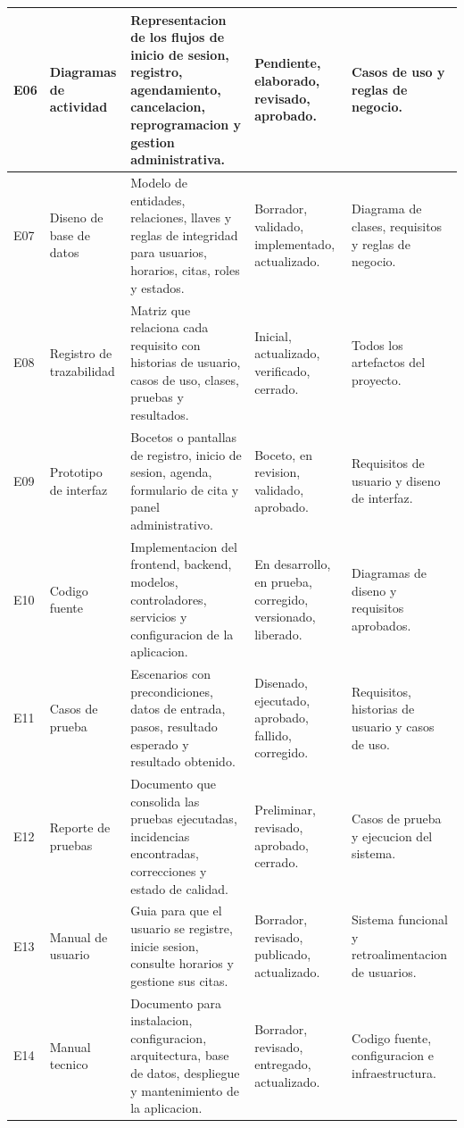 \documentclass[12pt,letterpaper]{article}
\begin{document}
\begin{longtable}{|p{1.2cm}|p{3.2cm}|p{5.4cm}|p{3.2cm}|p{3.2cm}|}
E06 & Diagramas de actividad & Representacion de los flujos de inicio de sesion, registro, agendamiento, cancelacion, reprogramacion y gestion administrativa. & Pendiente, elaborado, revisado, aprobado. & Casos de uso y reglas de negocio. \\
\hline

E07 & Diseno de base de datos & Modelo de entidades, relaciones, llaves y reglas de integridad para usuarios, horarios, citas, roles y estados. & Borrador, validado, implementado, actualizado. & Diagrama de clases, requisitos y reglas de negocio. \\
\hline

E08 & Registro de trazabilidad & Matriz que relaciona cada requisito con historias de usuario, casos de uso, clases, pruebas y resultados. & Inicial, actualizado, verificado, cerrado. & Todos los artefactos del proyecto. \\
\hline

E09 & Prototipo de interfaz & Bocetos o pantallas de registro, inicio de sesion, agenda, formulario de cita y panel administrativo. & Boceto, en revision, validado, aprobado. & Requisitos de usuario y diseno de interfaz. \\
\hline

E10 & Codigo fuente & Implementacion del frontend, backend, modelos, controladores, servicios y configuracion de la aplicacion. & En desarrollo, en prueba, corregido, versionado, liberado. & Diagramas de diseno y requisitos aprobados. \\
\hline

E11 & Casos de prueba & Escenarios con precondiciones, datos de entrada, pasos, resultado esperado y resultado obtenido. & Disenado, ejecutado, aprobado, fallido, corregido. & Requisitos, historias de usuario y casos de uso. \\
\hline

E12 & Reporte de pruebas & Documento que consolida las pruebas ejecutadas, incidencias encontradas, correcciones y estado de calidad. & Preliminar, revisado, aprobado, cerrado. & Casos de prueba y ejecucion del sistema. \\
\hline

E13 & Manual de usuario & Guia para que el usuario se registre, inicie sesion, consulte horarios y gestione sus citas. & Borrador, revisado, publicado, actualizado. & Sistema funcional y retroalimentacion de usuarios. \\
\hline

E14 & Manual tecnico & Documento para instalacion, configuracion, arquitectura, base de datos, despliegue y mantenimiento de la aplicacion. & Borrador, revisado, entregado, actualizado. & Codigo fuente, configuracion e infraestructura. \\
\hline
\end{longtable}
\end{document}
